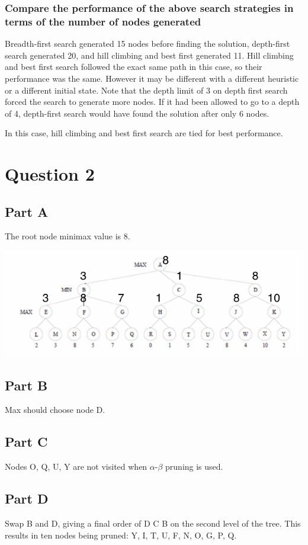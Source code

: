 \documentclass[a4paper]{article}
\begin{document}
\subsubsection{Compare the performance of the above search strategies in terms of the number of nodes generated}
Breadth-first search generated 15 nodes before finding the solution, depth-first search generated 20, and hill climbing and best first generated 11.
Hill climbing and best first search followed the exact same path in this case, so their performance was the same.  However it may be different with a 
different heuristic or a different initial state. Note that the depth limit of 3 on depth first search forced the search to generate more nodes.  If it 
had been allowed to go to a depth of 4, depth-first search would have found the solution after only 6 nodes.

In this case, hill climbing and best first search are tied for best performance.

\section{Question 2}



\subsection{Part A}
The root node minimax value is 8.
\begin{center}
\includegraphics[width=1\textwidth]{a1q2a.png}
\end{center}

\subsection{Part B}
Max should choose node D.

\subsection{Part C}
Nodes {O, Q, U, Y} are not visited when $\alpha$-$\beta$ pruning is used.

\subsection{Part D}
Swap B and D, giving a final order of {D C B} on the second level of the tree.
This results in ten nodes being pruned: {Y, I, T, U, F, N, O, G, P, Q}.
\end{document}
